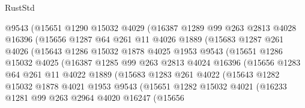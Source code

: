 \begin{lexlean}{RustStd}
\begin{coremodule}
                  @9543
                  (@15651
                    @1290
                    @15032
                    @4029
                    (@16387
                      @1289
                      @99
                      @263
                      @2813
                      @4028
                      @16396
                      (@15656
                        @1287
                        @64
                        @261
                        @11
                        @4026
                        @1889
                        (@15683
                          @1287
                          @261
                          @4026
                          (@15643
                            @1286
                            @15032
                            @1878
                            @4025
                            @1953
                            @9543
                            (@15651
                              @1286
                              @15032
                              @4025
                              (@16387
                                @1285
                                @99
                                @263
                                @2813
                                @4024
                                @16396
                                (@15656
                                  @1283
                                  @64
                                  @261
                                  @11
                                  @4022
                                  @1889
                                  (@15683
                                    @1283
                                    @261
                                    @4022
                                    (@15643
                                      @1282
                                      @15032
                                      @1878
                                      @4021
                                      @1953
                                      @9543
                                      (@15651
                                        @1282
                                        @15032
                                        @4021
                                        (@16233
                                          @1281
                                          @99
                                          @263
                                          @2964
                                          @4020
                                          @16247
                                          (@15656

\end{coremodule}
\end{lexlean}
